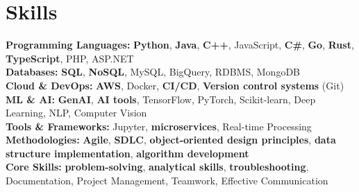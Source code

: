 \documentclass[a4paper,10pt]{article}
\begin{document}
\section*{Skills}
\textbf{Programming Languages: } \textbf{Python}, \textbf{Java}, \textbf{C++}, JavaScript, \textbf{C\#}, \textbf{Go}, \textbf{Rust}, \textbf{TypeScript}, PHP, ASP.NET \\
\textbf{Databases: } \textbf{SQL}, \textbf{NoSQL}, MySQL, BigQuery, RDBMS, MongoDB \\
\textbf{Cloud \& DevOps: } \textbf{AWS}, Docker, \textbf{CI/CD}, \textbf{Version control systems} (Git) \\
\textbf{ML \& AI: } \textbf{GenAI}, \textbf{AI tools}, TensorFlow, PyTorch, Scikit-learn, Deep Learning, NLP, Computer Vision \\
\textbf{Tools \& Frameworks: } Jupyter, \textbf{microservices}, Real-time Processing\\
\textbf{Methodologies: } \textbf{Agile}, \textbf{SDLC}, \textbf{object-oriented design principles}, \textbf{data structure implementation}, \textbf{algorithm development} \\
\textbf{Core Skills: } \textbf{problem-solving}, \textbf{analytical skills}, \textbf{troubleshooting}, Documentation, Project Management, Teamwork, Effective Communication \\

\vspace{-4mm}
\end{document}
